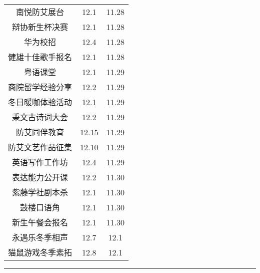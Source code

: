 \documentclass[letterpaper, 12pt]{article}
\begin{document}
\begin{multicols}{2}
{\begin{longtable}{|c|c|c|}
    南悦防艾展台 & 12.1 & 11.28\\
    辩协新生杯决赛 & 12.1 & 11.28\\
    华为校招 & 12.4 & 11.28\\
    健雄十佳歌手报名 & 12.1 & 11.28\\
    粤语课堂 & 12.1 & 11.29\\
    商院留学经验分享 & 12.2 & 11.29\\
    冬日暖咖体验活动 & 12.1 & 11.29\\
    秉文古诗词大会 & 12.2 & 11.29\\
    防艾同伴教育 & 12.15 & 11.29\\
    防艾文艺作品征集 & 12.10 & 11.29\\
    英语写作工作坊 & 12.4 & 11.29\\
    表达能力公开课 & 12.2 & 11.30\\
    紫藤学社剧本杀 & 12.1 & 11.30\\
    鼓楼口语角 & 12.1 & 11.30\\
    新生午餐会报名 & 12.1 & 11.30\\
    永遇乐冬季相声 & 12.7 & 12.1\\
    猫鼠游戏冬季素拓 & 12.8 & 12.1\\
    \hline
\end{longtable}
\unskip
\unpenalty
\unpenalty}\unvbox\colbbox
\end{multicols}
\hrule
\pagebreak
\end{document}
